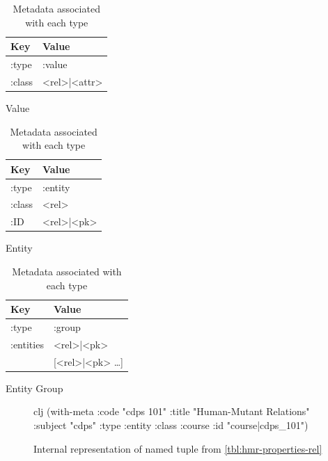 			\begin{table}
				\begin{subtable}[b]{0.33\linewidth}
					\centering
					
					\begin{tabular}{ll}
						\toprule
						Key & Value \\
						\midrule
						:type & :value \\
						:class & <rel>|<attr> \\
						\bottomrule
					\end{tabular}
					
					\caption{Value}
				\end{subtable}
				\begin{subtable}[b]{0.33\linewidth}
					\centering
					
					\begin{tabular}{ll}
						\toprule
						Key & Value \\
						\midrule
						:type & :entity \\
						:class & <rel> \\
						:ID & <rel>|<pk> \\
						\bottomrule
					\end{tabular}
					
					\caption{Entity}
				\end{subtable}
				\begin{subtable}[b]{0.33\linewidth}
					\centering
					
					\begin{tabular}{ll}
						\toprule
						Key & Value \\
						\midrule
						:type & :group \\
						:entities & <rel>|<pk> \\
						 & [<rel>|<pk> \ldots] \\
						\bottomrule
					\end{tabular}
					
					\caption{Entity Group}
				\end{subtable}
				
				\caption{Metadata associated with each type}
				\label{tbl:type-metadata}
			\end{table}
			
			\begin{figure}
				\begin{singlespaced}
					\begin{pygments}{clj}
(with-meta
  {:code    "cdps 101"
   :title   "Human-Mutant Relations"
   :subject "cdps"}
  {:type  :entity
   :class :course
   :id    "course|cdps_101"})
					\end{pygments}
				\end{singlespaced}
				
				\caption{Internal representation of named tuple from \cref{tbl:hmr-properties-rel}}
				\label{clj:with-meta-internal-rep}
			\end{figure}
			
